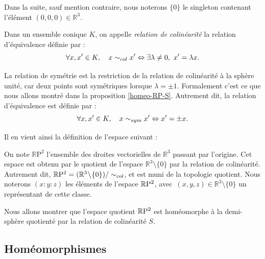 \documentclass[hidelinks, 10pt]{article}
\begin{document}
Dans la suite, sauf mention contraire, nous noterons $\{0\}$ le singleton contenant l'élément $(0,0,0)\in\mathbb{R}^3$.

\begin{definition}
Dans un ensemble conique $K$, on appelle \emph{relation de colinéarité} la relation d'équivalence définie par : \[\forall x,x'\in K,\quad x\sim_{col} x'\Leftrightarrow\exists\lambda\neq0,\ x'=\lambda x.\]

La relation de symétrie est la restriction de la relation de colinéarité à la sphère unité, car deux points sont symétriques lorsque $\lambda=\pm1$. Formalement c'est ce que nous allons montré dans la proposition \ref{homeo-RP-S}. Autrement dit, la relation d'équivalence est définie par : \[\forall x,x'\in K,\quad x\sim_{sym} x'\Leftrightarrow x'=\pm x.\]
\end{definition}

Il en vient ainsi la définition de l'espace suivant :

\begin{definition}
On note $\mathbb{R}\mathrm{P}^2$ l'ensemble des droites vectorielles de $\mathbb{R}^3$ passant par l'origine. Cet espace est obtenu par le quotient de l'espace $\mathbb{R}^3\setminus\{0\}$ par la relation de colinéarité. Autrement dit, $\mathbb{R}\mathrm{P}^2=(\mathbb{R}^3\!\setminus\!\{0\})/\sim_{col}$, et est muni de la topologie quotient. Nous noterons $(x:y:z)$ les éléments de l'espace $\mathbb{R}\mathrm{P}^2$, avec~$(x,y,z)\in\mathbb{R}^3\setminus\{0\}$ un représentant de cette classe.
\end{definition}

Nous allons montrer que l'espace quotient $\mathbb{R}\mathrm{P}^2$ est homéomorphe à la demi-sphère quotienté par la relation de colinéarité $S$.

\subsection{Homéomorphismes}
\end{document}

